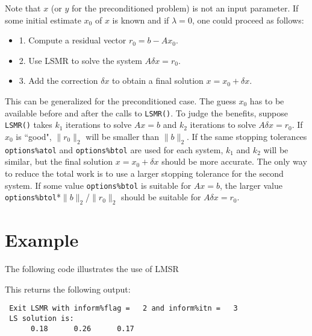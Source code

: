      Note that $x$ (or $y$ for the preconditioned problem) is not an input
     parameter.
     If some initial estimate $x_0$ of $x$ is known and if $\lambda = 0$,
     one could proceed as follows:
    \begin{itemize} 
     \item 1. Compute a residual vector     $r_0 = b - Ax_0$.
    \item 2. Use LSMR to solve the system  $A \delta x = r_0$.
    \item 3. Add the correction $\delta x$ to obtain a final solution $x = x_0 + \delta x$.
    \end{itemize}
     This can be generalized for the preconditioned case.
     The guess $x_0$ has to be available before and after the calls
     to {\tt LSMR()}.  To judge the benefits, suppose {\tt LSMR()} takes $k_1$ iterations
     to solve $Ax = b$ and $k_2$ iterations to solve $A \delta x = r_0$.
     If $x_0$ is ``good", $\|r_0\|_2$ will be smaller than $\|b\|_2$.
     If the same stopping tolerances {\tt options\%atol} and {\tt options\%btol}
      are used for each
     system, $k_1$ and $k_2$ will be similar, but the final solution $x = x_0 + \delta x$
     should be more accurate.  The only way to reduce the total work
     is to use a larger stopping tolerance for the second system.
     If some value {\tt options\%btol} is suitable for $Ax=b$, the larger value
     {\tt options\%btol}*$\|b\|_2$/$\|r_0\|_2$  should be suitable for $A \delta x = r_0$.
    




\section{Example}
The following code illustrates the use of LMSR



This returns the following output:

\begin{verbatim}
 Exit LSMR with inform%flag =   2 and inform%itn =   3
 LS solution is:
      0.18      0.26      0.17
\end{verbatim}

\begin{funders}
\end{funders}
